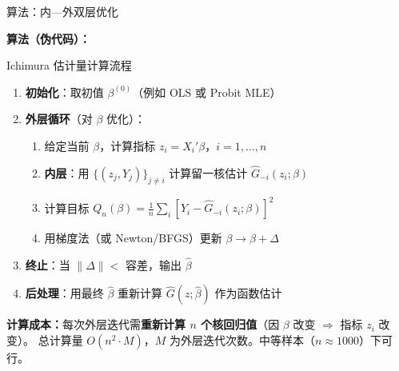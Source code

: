 \documentclass[aspectratio=169, 10pt]{beamer}
\begin{document}
\begin{frame}{算法：内—外双层优化}

  \textbf{算法（伪代码）：}

  \begin{examplebox}{{Ichimura 估计量计算流程}}
    \begin{enumerate}\setlength{\itemsep}{1pt}
      \item \textbf{初始化}：取初值 $\beta^{(0)}$（例如 OLS 或 Probit MLE）
      \item \textbf{外层循环}（对 $\beta$ 优化）：
      \begin{enumerate}
        \item 给定当前 $\beta$，计算指标 $z_i = X_i'\beta$，$i = 1, \ldots, n$
        \item \textbf{内层}：用 $\{(z_j, Y_j)\}_{j \neq i}$ 计算留一核估计 $\hat G_{-i}(z_i; \beta)$
        \item 计算目标 $Q_n(\beta) = \tfrac{1}{n}\sum_i [Y_i - \hat G_{-i}(z_i; \beta)]^2$
        \item 用梯度法（或 Newton/BFGS）更新 $\beta \to \beta + \Delta$
      \end{enumerate}
      \item \textbf{终止}：当 $\|\Delta\| < $ 容差，输出 $\hat\beta$
      \item \textbf{后处理}：用最终 $\hat\beta$ 重新计算 $\hat G(z; \hat\beta)$ 作为函数估计
    \end{enumerate}
  \end{examplebox}

  \begin{keybox}
    \textbf{计算成本：}每次外层迭代需\textbf{重新计算 $n$ 个核回归值}（因 $\beta$ 改变 $\Rightarrow$ 指标 $z_i$ 改变）。
    总计算量 $O(n^2 \cdot M)$，$M$ 为外层迭代次数。中等样本（$n \approx 1000$）下可行。
  \end{keybox}

\end{frame}
\end{document}
